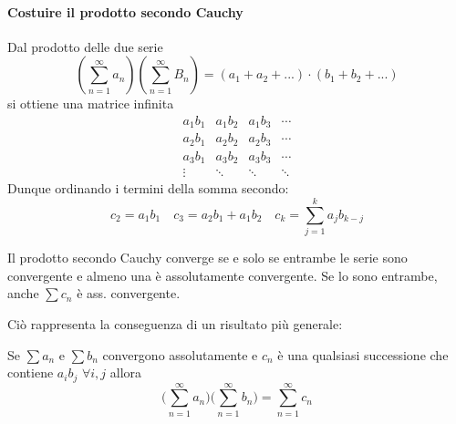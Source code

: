 \documentclass[10pt]{article}
\theoremstyle{plain}
\begin{document}
\paragraph{Costuire il prodotto secondo Cauchy} Dal prodotto delle due serie
\[(\sum \limits_{n=1}^{\infty}a_n)(\sum \limits_{n=1}^{\infty}B_n) = (a_1 + a_2 + ...) \cdot (b_1 + b_2 + ...)\]
si ottiene una matrice infinita
\[\begin{matrix}
    a_1 b_1 & a_1 b_2 & a_1 b_3 &\cdots \\
    a_2 b_1 & a_2 b_2 & a_2 b_3 & \cdots \\
    a_3 b_1 & a_3 b_2 & a_3 b_3 & \cdots \\
    \vdots & \ddots & \ddots & \ddots 
\end{matrix}\]
Dunque ordinando i termini della somma secondo:
\[c_2 = a_1 b_1 \quad c_3 = a_2 b_1 + a_1 b_2 \quad c_k = \sum\limits_{j=1}^{k} a_j b_{k - j}\]
\begin{ther}
    Il prodotto secondo Cauchy converge se e solo se entrambe le serie sono convergente e almeno una è assolutamente convergente. Se lo sono entrambe, anche $\sum c_n$ è ass. convergente.
\end{ther}
Ciò rappresenta la conseguenza di un risultato più generale:
\begin{ther}
    Se $\sum a_n$ e $\sum b_n$ convergono assolutamente e $c_n$ è una qualsiasi successione che contiene $a_i b_j$ $\forall i, j$ allora
    \[\bigg(\sum \limits_{n=1}^\infty a_n \bigg)\bigg(\sum \limits_{n=1}^\infty b_n\bigg) = \sum \limits_{n=1}^\infty c_n\]
\end{ther}
\end{document}
